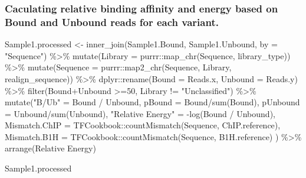 \documentclass[
]{article}
\newenvironment{Shaded}{\begin{snugshade}}{\end{snugshade}}
\newcommand{\AttributeTok}[1]{\textcolor[rgb]{0.77,0.63,0.00}{#1}}
\newcommand{\DecValTok}[1]{\textcolor[rgb]{0.00,0.00,0.81}{#1}}
\newcommand{\FunctionTok}[1]{\textcolor[rgb]{0.00,0.00,0.00}{#1}}
\newcommand{\NormalTok}[1]{#1}
\newcommand{\OtherTok}[1]{\textcolor[rgb]{0.56,0.35,0.01}{#1}}
\newcommand{\SpecialCharTok}[1]{\textcolor[rgb]{0.00,0.00,0.00}{#1}}
\newcommand{\StringTok}[1]{\textcolor[rgb]{0.31,0.60,0.02}{#1}}
\begin{document}
\hypertarget{caculating-relative-binding-affinity-and-energy-based-on-bound-and-unbound-reads-for-each-variant.}{%
\subsubsection{Caculating relative binding affinity and energy based on
Bound and Unbound reads for each
variant.}\label{caculating-relative-binding-affinity-and-energy-based-on-bound-and-unbound-reads-for-each-variant.}}

\begin{Shaded}
\begin{Highlighting}[]
\NormalTok{Sample1.processed }\OtherTok{\textless{}{-}} 
  \FunctionTok{inner\_join}\NormalTok{(Sample1.Bound, Sample1.Unbound, }\AttributeTok{by =} \StringTok{"Sequence"}\NormalTok{) }\SpecialCharTok{\%\textgreater{}\%}
  \FunctionTok{mutate}\NormalTok{(}\AttributeTok{Library =}\NormalTok{ purrr}\SpecialCharTok{::}\FunctionTok{map\_chr}\NormalTok{(Sequence, library\_type)) }\SpecialCharTok{\%\textgreater{}\%}
  \FunctionTok{mutate}\NormalTok{(}\AttributeTok{Sequence =}\NormalTok{ purrr}\SpecialCharTok{::}\FunctionTok{map2\_chr}\NormalTok{(Sequence, Library, realign\_sequence)) }\SpecialCharTok{\%\textgreater{}\%}
\NormalTok{  dplyr}\SpecialCharTok{::}\FunctionTok{rename}\NormalTok{(}\AttributeTok{Bound =} \StringTok{\textquotesingle{}Reads.x\textquotesingle{}}\NormalTok{, }\AttributeTok{Unbound =} \StringTok{\textquotesingle{}Reads.y\textquotesingle{}}\NormalTok{) }\SpecialCharTok{\%\textgreater{}\%}
  \FunctionTok{filter}\NormalTok{(Bound}\SpecialCharTok{+}\NormalTok{Unbound }\SpecialCharTok{\textgreater{}=}\DecValTok{50}\NormalTok{, Library }\SpecialCharTok{!=} \StringTok{"Unclassified"}\NormalTok{) }\SpecialCharTok{\%\textgreater{}\%}
  \FunctionTok{mutate}\NormalTok{(}\StringTok{"B/Ub"} \OtherTok{=}\NormalTok{ Bound }\SpecialCharTok{/}\NormalTok{ Unbound,}
         \AttributeTok{pBound =}\NormalTok{ Bound}\SpecialCharTok{/}\FunctionTok{sum}\NormalTok{(Bound),}
         \AttributeTok{pUnbound =}\NormalTok{ Unbound}\SpecialCharTok{/}\FunctionTok{sum}\NormalTok{(Unbound),}
         \StringTok{"Relative Energy"} \OtherTok{=} \SpecialCharTok{{-}}\FunctionTok{log}\NormalTok{(Bound }\SpecialCharTok{/}\NormalTok{ Unbound),}
         \AttributeTok{Mismatch.ChIP =}\NormalTok{ TFCookbook}\SpecialCharTok{::}\FunctionTok{countMismatch}\NormalTok{(Sequence, ChIP.reference),}
          \AttributeTok{Mismatch.B1H =}\NormalTok{  TFCookbook}\SpecialCharTok{::}\FunctionTok{countMismatch}\NormalTok{(Sequence, B1H.reference)}
\NormalTok{         ) }\SpecialCharTok{\%\textgreater{}\%}
  \FunctionTok{arrange}\NormalTok{(}\StringTok{\textasciigrave{}}\AttributeTok{Relative Energy}\StringTok{\textasciigrave{}}\NormalTok{)}

\NormalTok{Sample1.processed}
\end{Highlighting}
\end{Shaded}
\end{document}
